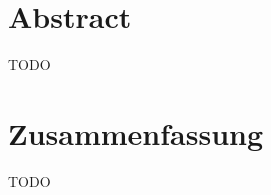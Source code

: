 \chapter*{Abstract}
\label{chap:abstract}

TODO

\chapter*{Zusammenfassung}
\label{chap:zusammenfassung}

TODO